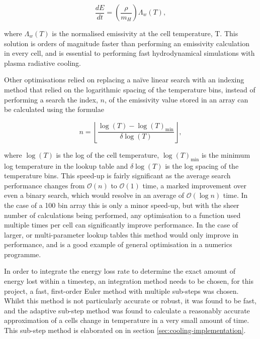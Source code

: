 \begin{equation}
  \frac{dE}{dt} = \left(\frac{\rho}{m_H}\right) \Lambda_w (T) ,
\end{equation}

\noindent
where $\Lambda_w(T)$ is the normalised emissivity at the cell temperature, T.
This solution is orders of magnitude faster than performing an emissivity calculation in every cell, and is essential to performing fast hydrodynamical simulations with plasma radiative cooling.



Other optimisations relied on replacing a na\"ive linear search with an indexing method that relied on the logarithmic spacing of the temperature bins, instead of performing a search the index, $n$, of the emissivity value stored in an array can be calculated using the formulae

\begin{equation}
    n = \left \lfloor \frac{\log(T) - \log(T)_\text{min}}{\delta \log (T)} \right \rfloor ,
\end{equation}

\noindent
where $\log(T)$ is the log of the cell temperature, $\log (T)_\text{min}$ is the minimum log temperature in the lookup table and $\delta \log (T)$ is the log spacing of the temperature bins. 
This speed-up is fairly significant as the average search performance changes from $\mathcal{O}(n)$ to $\mathcal{O}(1)$ time, a marked improvement over even a binary search, which would resolve in an average of $\mathcal{O}(\log n)$ time.
In the case of a 100 bin array this is only a minor speed-up, but with the sheer number of calculations being performed, any optimisation to a function used multiple times per cell can significantly improve performance.
In the case of larger, or multi-parameter lookup tables this method would only improve in performance, and is a good example of general optimisation in a numerics programme.

In order to integrate the energy loss rate to determine the exact amount of energy lost within a timestep, an integration method needs to be chosen, for this project, a fast, first-order Euler method with multiple sub-steps was chosen. Whilst this method is not particularly accurate or robust, it was found to be fast, and the adaptive sub-step method was found to calculate a reasonably accurate approximation of a cells change in temperature in a very small amount of time. This sub-step method is elaborated on in section \ref{sec:cooling-implementation}.

